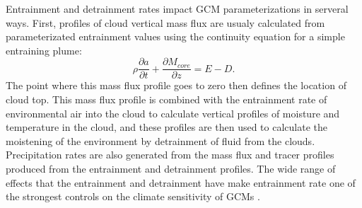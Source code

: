 \documentclass[12pt]{article}
\begin{document}
Entrainment and detrainment rates impact GCM parameterizations in serveral ways.
First, profiles of cloud vertical mass flux are usualy calculated from 
parameterizated entrainment values using the continuity equation for a 
simple entraining plume:
\begin{equation}
   \label{eq:continuity}
   \rho \frac{\partial a}{\partial t} 
   + \frac{\partial M_{core}}{\partial z} = E - D.
\end{equation}
The point where this mass flux profile goes to zero then defines the location 
of cloud top.  This mass flux profile is combined with the entrainment rate 
of environmental air into the cloud to calculate vertical profiles of moisture
and temperature in the cloud, and these profiles are then used to calculate 
the moistening of the environment by detrainment of fluid from the clouds.
Precipitation rates are also generated from the mass flux and tracer profiles 
produced from the entrainment and detrainment profiles.  The wide range of
effects that the entrainment and detrainment have make entrainment rate one of
the strongest controls on the climate sensitivity of GCMs 
\citep{Stainforth2005, Rougier2009}.
\end{document}
